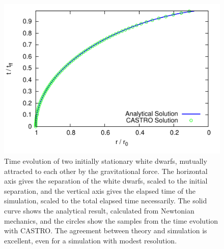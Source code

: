 \documentclass[12pt,preprint]{aastex}
\begin{document}
\begin{figure}
  \centering
  \includegraphics[scale=2.0]{freefall/plot_freefall}
  \caption{Time evolution of two initially stationary white dwarfs,
    mutually attracted to each other by the gravitational force. The
    horizontal axis gives the separation of the white dwarfs, scaled
    to the initial separation, and the vertical axis gives the elapsed
    time of the simulation, scaled to the total elapsed time
    necessarily. The solid curve shows the analytical result,
    calculated from Newtonian mechanics, and the circles show the
    samples from the time evolution with CASTRO. The agreement between
    theory and simulation is excellent, even for a simulation with
    modest resolution.}
  \label{Fig:Free Fall}
\end{figure}
\end{document}
